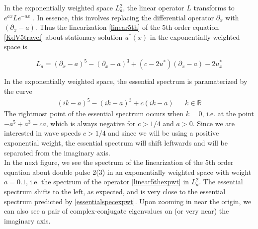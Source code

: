 \documentclass[12pt]{article}
\def\R{{\mathbb R}}
\begin{document}
In the exponentially weighted space $L^2_a$, the linear operator $L$ transforms to $e^{ax} L e^{-ax}$ \cite{Kapitula2013}. In essence, this involves replacing the differential operator $\partial_x$ with $(\partial_x - a)$. Thus the linearization \eqref{linear5th} of the 5th order equation \eqref{KdV5travel} about stationary solution $u^*(x)$ in the exponentially weighted space is

\begin{equation}\label{linear5thexpwt}
L_a = (\partial_x - a)^5 - (\partial_x - a)^3 + (c - 2 u^*)(\partial_x - a) - 2 u^*_x
\end{equation}

In the exponentially weighted space, the essential spectrum is paramaterized by the curve
\begin{align}\label{essentialspecexpwt}
(i k - a)^5 - (i k - a)^3 + c(i k - a) && k \in \R
\end{align}
The rightmost point of the essential spectrum occurs when $k = 0$, i.e. at the point $-a^5 + a^3 - c a$, which is always negative for $c > 1/4$ and $a > 0$. Since we are interested in wave speeds $c > 1/4$ and since we will be using a positive exponential weight, the essential spectrum will shift leftwards and will be separated from the imaginary axis.\\

In the next figure, we see the spectrum of the linearization of the 5th order equation about double pulse 2(3) in an exponentially weighted space with weight $a = 0.1$, i.e. the spectrum of the operator \eqref{linear5thexpwt} in $L^2_a$. The essential spectrum shifts to the left, as expected, and is very close to the essential spectrum predicted by \eqref{essentialspecexpwt}. Upon zooming in near the origin, we can also see a pair of complex-conjugate eigenvalues on (or very near) the imaginary axis.
\end{document}
